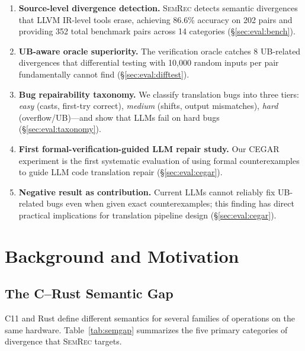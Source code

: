 \documentclass[11pt]{article}
\newcommand{\semrec}{\textsc{SemRec}}
\begin{document}
\begin{enumerate}[leftmargin=*,nosep]
\item \textbf{Source-level divergence detection.}
      \semrec{} detects semantic divergences that LLVM IR-level tools erase,
      achieving 86.6\% accuracy on 202 pairs and providing 352 total
      benchmark pairs across 14 categories (\S\ref{sec:eval:bench}).

\item \textbf{UB-aware oracle superiority.}
      The verification oracle catches 8 UB-related divergences that
      differential testing with 10{,}000 random inputs per pair
      fundamentally cannot find (\S\ref{sec:eval:difftest}).

\item \textbf{Bug repairability taxonomy.}
      We classify translation bugs into three tiers:
      \emph{easy} (casts, first-try correct), \emph{medium} (shifts, output
      mismatches), \emph{hard} (overflow/UB)---and show that LLMs fail on
      hard bugs (\S\ref{sec:eval:taxonomy}).

\item \textbf{First formal-verification-guided LLM repair study.}
      Our CEGAR experiment is the first systematic evaluation of using formal
      counterexamples to guide LLM code translation repair
      (\S\ref{sec:eval:cegar}).

\item \textbf{Negative result as contribution.}
      Current LLMs cannot reliably fix UB-related bugs even when given exact
      counterexamples; this finding has direct practical implications for
      translation pipeline design (\S\ref{sec:eval:cegar}).
\end{enumerate}

\section{Background and Motivation}\label{sec:background}

\subsection{The C--Rust Semantic Gap}

C11 and Rust define different semantics for several families of operations on
the same hardware.  Table~\ref{tab:semgap} summarizes the five primary
categories of divergence that \semrec{} targets.
\end{document}
